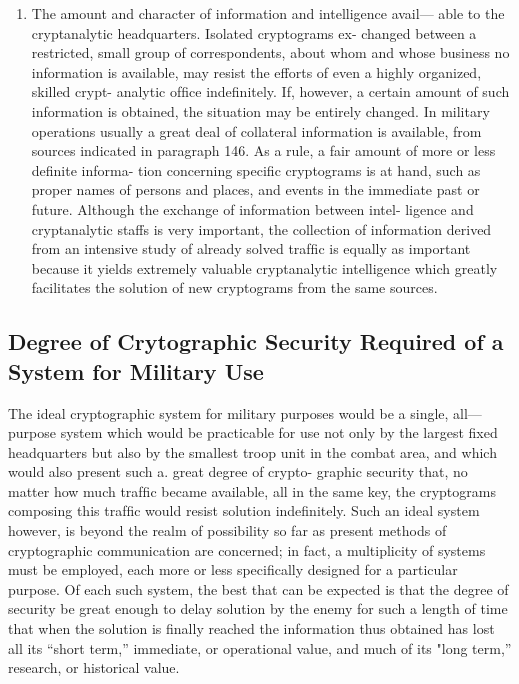 \begin{enumerate}
\item The amount and character of information and intelligence avail—
able to the cryptanalytic headquarters. Isolated cryptograms ex-
changed between a restricted, small group of correspondents,
about whom and whose business no information is available,
may resist the efforts of even a highly organized, skilled crypt-
analytic ofﬁce indeﬁnitely. If, however, a certain amount of
such information is obtained, the situation may be entirely
changed. In military operations usually a great deal of collateral
information is available, from sources indicated in paragraph
146. As a rule, a fair amount of more or less deﬁnite informa-
tion concerning speciﬁc cryptograms is at hand, such as proper
names of persons and places, and events in the immediate past
or future. Although the exchange of information between intel-
ligence and cryptanalytic staffs is very important, the collection
of information derived from an intensive study of already
solved trafﬁc is equally as important because it yields extremely
valuable cryptanalytic intelligence which greatly facilitates the
solution of new cryptograms from the same sources.
\end{enumerate}

\subsection{Degree of Crytographic Security Required of a System for Military Use}

The ideal cryptographic system for military purposes would be a
single, all—purpose system which would be practicable for use not only by
the largest ﬁxed headquarters but also by the smallest troop unit in the
combat area, and which would also present such a. great degree of crypto-
graphic security that, no matter how much trafﬁc became available, all
in the same key, the cryptograms composing this trafﬁc would resist
solution indeﬁnitely. Such an ideal system however, is beyond the realm
of possibility so far as present methods of cryptographic communication
are concerned; in fact, a multiplicity of systems must be employed, each
more or less speciﬁcally designed for a particular purpose. Of each such
system, the best that can be expected is that the degree of security be
great enough to delay solution by the enemy for such a length of time
that when the solution is ﬁnally reached the information thus obtained
has lost all its “short term,” immediate, or operational value, and much
of its "long term,” research, or historical value.


